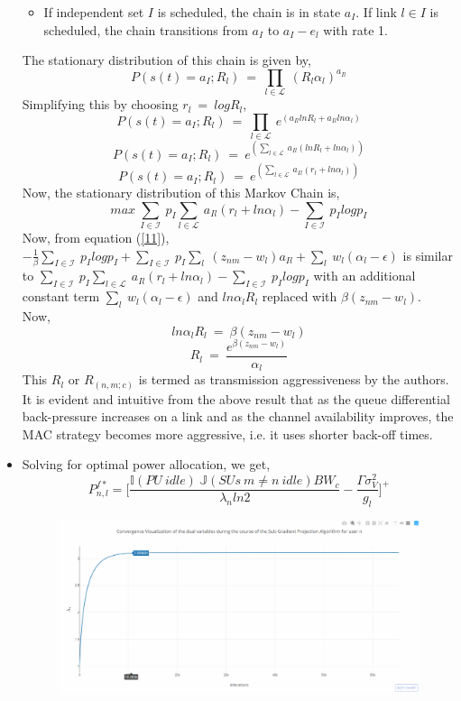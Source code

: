 \documentclass[12pt, draftcls, onecolumn]{IEEEtran}
\begin{document}
\begin{itemize}
\begin{itemize}
        \item If independent set $I$ is scheduled, the chain is in state $a_I$. If link $l \in I$ is scheduled, the chain transitions from $a_I$ to $a_I - e_l$ with rate 1.
    \end{itemize}
    The stationary distribution of this chain is given by,
    \[P(s(t)=a_I;R_l)\ =\ \prod_{l \in \mathcal{L}}\ (R_l \alpha_l)^{a_{Il}}\]
    Simplifying this by choosing $r_l\ =\ log R_l$,
    \[P(s(t)=a_I;R_l)\ =\ \prod_{l \in \mathcal{L}}\ e^{(a_{Il}ln R_l + a_{Il}ln \alpha_l)}\]
    \[P(s(t)=a_I;R_l)\ =\ e^{(\sum_{l \in \mathcal{L}}\ a_{Il}(ln R_l + ln \alpha_l))}\]
    \[P(s(t)=a_I;R_l)\ =\ e^{(\sum_{l \in \mathcal{L}}\ a_{Il}(r_l + ln \alpha_l))}\]
    Now, the stationary distribution of this Markov Chain is,
    \[max\ \sum_{I \in \mathcal{I}}\ p_I \sum_{l \in \mathcal{L}}\ a_{Il}(r_l + ln \alpha_l) - \sum_{I \in \mathcal{I}}\ p_I log p_I\]
    Now, from equation (\ref{11}), $- \frac{1}{\beta}\sum_{I \in \mathcal{I}}\ p_I log p_I + \sum_{I \in \mathcal{I}}\ p_I\sum_{l}\ (z_{nm} - w_l)a_{Il} + \sum_{l}\ w_l(\alpha_l - \epsilon)$ is similar to $\sum_{I \in \mathcal{I}}\ p_I \sum_{l \in \mathcal{L}}\ a_{Il}(r_l + ln \alpha_l) - \sum_{I \in \mathcal{I}}\ p_I log p_I$ with an additional constant term $\sum_{l}\ w_l(\alpha_l - \epsilon)$ and $ln \alpha_l R_l$ replaced with $\beta(z_{nm} - w_l)$.
    \\Now,
    \[ln \alpha_l R_l\ =\ \beta(z_{nm} - w_l)\]
    \[R_l\ =\ \frac{e^{\beta(z_{nm} - w_l)}}{\alpha_l}\]
    This $R_l$ or $R_{(n,m;c)}$ is termed as transmission aggressiveness by the authors. It is evident and intuitive from the above result that as the queue differential back-pressure increases on a link and as the channel availability improves, the MAC strategy becomes more aggressive, i.e. it uses shorter back-off times.
    \item Solving for optimal power allocation, we get,
    \[P_{n,l}^{f*} = \Big[\frac{\mathbb{I}(PU\ idle)\ \mathbb{J}(SUs\ m \not = n\ idle) BW_c}{\lambda_n ln 2} - \frac{\Gamma \sigma_V^2}{g_l}\Big]^+\]
    \begin{figure}[t]
        \includegraphics[width=1.0\textwidth]{Power_Allocation_Convergence_Analysis_Dual_Variables.png}

\end{figure}
\end{itemize}
\end{document}
